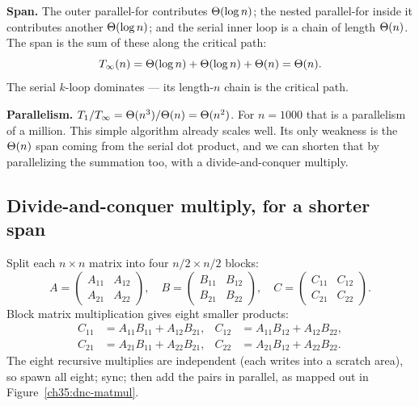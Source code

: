 \textbf{Span.} The outer parallel-for contributes $\Theta(\log n)$; the nested
parallel-for inside it contributes another $\Theta(\log n)$; and the serial inner
loop is a chain of length $\Theta(n)$. The span is the sum of these along the
critical path:
\[
T_\infty(n) = \Theta(\log n) + \Theta(\log n) + \Theta(n) = \Theta(n).
\]
The serial $k$-loop dominates --- its length-$n$ chain is the critical path.

\textbf{Parallelism.} $T_1/T_\infty = \Theta(n^3)/\Theta(n) = \Theta(n^2)$. For
$n = 1000$ that is a parallelism of a million. This simple algorithm already
scales well. Its only weakness is the $\Theta(n)$ span coming from the serial dot
product, and we can shorten that by parallelizing the summation too, with a
divide-and-conquer multiply.

\subsection{Divide-and-conquer multiply, for a shorter span}

Split each $n \times n$ matrix into four $n/2 \times n/2$ blocks:
\[
A = \begin{pmatrix} A_{11} & A_{12} \\ A_{21} & A_{22}\end{pmatrix},\quad
B = \begin{pmatrix} B_{11} & B_{12} \\ B_{21} & B_{22}\end{pmatrix},\quad
C = \begin{pmatrix} C_{11} & C_{12} \\ C_{21} & C_{22}\end{pmatrix}.
\]
Block matrix multiplication gives eight smaller products:
\begin{align*}
C_{11} &= A_{11}B_{11} + A_{12}B_{21}, & C_{12} &= A_{11}B_{12} + A_{12}B_{22},\\
C_{21} &= A_{21}B_{11} + A_{22}B_{21}, & C_{22} &= A_{21}B_{12} + A_{22}B_{22}.
\end{align*}
The eight recursive multiplies are independent (each writes into a scratch area),
so spawn all eight; sync; then add the pairs in parallel, as mapped out in
Figure~\ref{ch35:dnc-matmul}.

